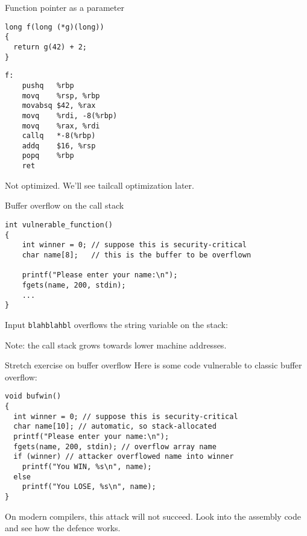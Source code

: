 \documentclass[landscape]{beamer}
\begin{document}
\begin{frame}[fragile]{Function pointer as a parameter}
\begin{minipage}{.5\textwidth}
\begin{verbatim}
long f(long (*g)(long))
{
  return g(42) + 2;
}
\end{verbatim}
\end{minipage}
%
\begin{minipage}{.4\textwidth}
\begin{verbatim}
f:                   
	pushq	%rbp
	movq	%rsp, %rbp
	movabsq	$42, %rax
	movq	%rdi, -8(%rbp)
	movq	%rax, %rdi
	callq	*-8(%rbp)
	addq	$16, %rsp
	popq	%rbp
	ret
\end{verbatim}
\end{minipage}
\vspace{3em}

Not optimized. We'll see tailcall optimization later.
\end{frame}


\begin{frame}[fragile]{Buffer overflow on the call stack}
\small
\begin{verbatim}
int vulnerable_function()
{
    int winner = 0; // suppose this is security-critical
    char name[8];   // this is the buffer to be overflown
    
    printf("Please enter your name:\n");
    fgets(name, 200, stdin);
    ...
}
\end{verbatim}
Input \texttt{blahblahbl} overflows the string variable on the stack:
\begin{center}
  \end{center}
 Note: the call stack grows towards \alert{lower} machine addresses.
\end{frame} 

\begin{frame}[fragile]{Stretch exercise on buffer overflow}
Here is some code vulnerable to classic buffer overflow:
\begin{verbatim}
void bufwin()
{
  int winner = 0; // suppose this is security-critical
  char name[10]; // automatic, so stack-allocated  
  printf("Please enter your name:\n");
  fgets(name, 200, stdin); // overflow array name
  if (winner) // attacker overflowed name into winner
    printf("You WIN, %s\n", name);
  else
    printf("You LOSE, %s\n", name);
}
\end{verbatim}
On modern compilers, this attack will not succeed. Look into the assembly code and see how the defence works.
\end{frame}
\end{document}
